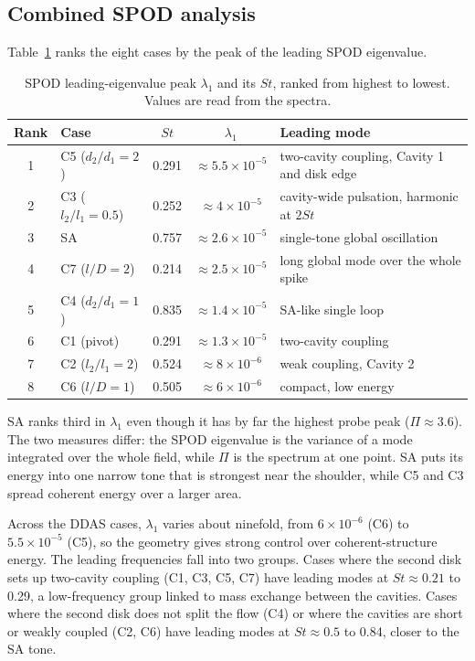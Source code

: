 \documentclass[11pt,a4paper]{article}
\newcommand{\ltl}{l_2/l_1}
\newcommand{\dtd}{d_2/d_1}
\begin{document}
\subsection{Combined SPOD analysis}\label{sec:spod_all}

Table~\ref{tab:spod} ranks the eight cases by the peak of the leading SPOD eigenvalue.

\begin{table}[htbp]
  \centering
  \caption{SPOD leading-eigenvalue peak $\lambda_1$ and its $St$, ranked from highest to lowest. Values are read from the spectra.}
  \label{tab:spod}
  \begin{tabular}{clccl}
    \toprule
    Rank & Case & $St$ & $\lambda_1$ & Leading mode \\
    \midrule
    1 & C5 ($\dtd = 2$) & 0.291 & $\approx 5.5\times10^{-5}$ & two-cavity coupling, Cavity 1 and disk edge \\
    2 & C3 ($\ltl = 0.5$) & 0.252 & $\approx 4\times10^{-5}$ & cavity-wide pulsation, harmonic at $2St$ \\
    3 & SA & 0.757 & $\approx 2.6\times10^{-5}$ & single-tone global oscillation \\
    4 & C7 ($l/D = 2$) & 0.214 & $\approx 2.5\times10^{-5}$ & long global mode over the whole spike \\
    5 & C4 ($\dtd = 1$) & 0.835 & $\approx 1.4\times10^{-5}$ & SA-like single loop \\
    6 & C1 (pivot) & 0.291 & $\approx 1.3\times10^{-5}$ & two-cavity coupling \\
    7 & C2 ($\ltl = 2$) & 0.524 & $\approx 8\times10^{-6}$ & weak coupling, Cavity 2 \\
    8 & C6 ($l/D = 1$) & 0.505 & $\approx 6\times10^{-6}$ & compact, low energy \\
    \bottomrule
  \end{tabular}
\end{table}

SA ranks third in $\lambda_1$ even though it has by far the highest probe peak ($\Pi \approx 3.6$). The two measures differ: the SPOD eigenvalue is the variance of a mode integrated over the whole field, while $\Pi$ is the spectrum at one point. SA puts its energy into one narrow tone that is strongest near the shoulder, while C5 and C3 spread coherent energy over a larger area.

Across the DDAS cases, $\lambda_1$ varies about ninefold, from $6\times10^{-6}$ (C6) to $5.5\times10^{-5}$ (C5), so the geometry gives strong control over coherent-structure energy. The leading frequencies fall into two groups. Cases where the second disk sets up two-cavity coupling (C1, C3, C5, C7) have leading modes at $St \approx 0.21$ to 0.29, a low-frequency group linked to mass exchange between the cavities. Cases where the second disk does not split the flow (C4) or where the cavities are short or weakly coupled (C2, C6) have leading modes at $St \approx 0.5$ to 0.84, closer to the SA tone.
\end{document}
